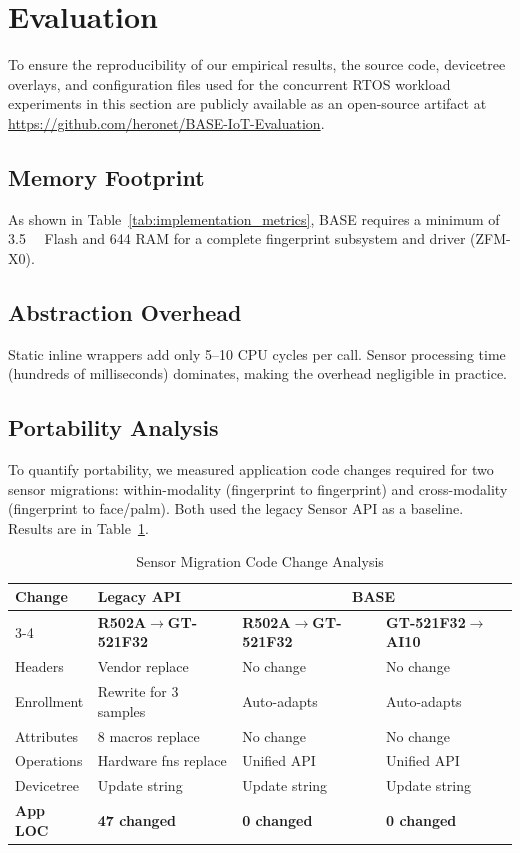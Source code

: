\section{Evaluation}
\label{sec:evaluation}

To ensure the reproducibility of our empirical results, the source code, devicetree overlays, and configuration files used for the concurrent RTOS workload experiments in this section are publicly available as an open-source artifact at \url{https://github.com/heronet/BASE-IoT-Evaluation}.

\subsection{Memory Footprint}

As shown in Table~\ref{tab:implementation_metrics}, BASE requires a minimum of \SI{3.5}{\kilo\byte} Flash and \SI{644}{\byte} RAM for a complete fingerprint subsystem and driver (ZFM-X0).

\subsection{Abstraction Overhead}

Static inline wrappers add only \numrange{5}{10} CPU cycles per call. Sensor processing time (hundreds of milliseconds) dominates, making the overhead negligible in practice.

\subsection{Portability Analysis}

To quantify portability, we measured application code changes required for two sensor migrations: within-modality (fingerprint to fingerprint) and cross-modality (fingerprint to face/palm). Both used the legacy Sensor API as a baseline. Results are in Table~\ref{tab:sensor_migration}.

\begin{table}[htbp]
\renewcommand{\arraystretch}{1.4}
\caption{Sensor Migration Code Change Analysis}
\label{tab:sensor_migration}
\begin{tabularx}{\linewidth}{|l|X|X|X|}
\hline
\textbf{Change} & \textbf{Legacy API} & \multicolumn{2}{c|}{\textbf{BASE}} \\
\cline{3-4}
 & \textbf{R502A$\to$GT-521F32} & \textbf{R502A$\to$GT-521F32} & \textbf{GT-521F32$\to$AI10} \\
\hline
Headers & Vendor replace & No change & No change \\
\hline
Enrollment & Rewrite for 3 samples & Auto-adapts & Auto-adapts \\
\hline
Attributes & 8 macros replace & No change & No change \\
\hline
Operations & Hardware fns replace & Unified API & Unified API \\
\hline
Devicetree & Update string & Update string & Update string \\
\hline
\textbf{App LOC} & \textbf{47 changed} & \textbf{0 changed} & \textbf{0 changed} \\
\hline
\end{tabularx}
\end{table}

